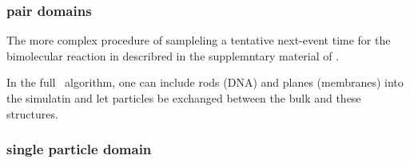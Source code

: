 \subsubsection{pair domains}
The more complex procedure of sampleling a tentative next-event time for the bimolecular reaction in describred in the supplemntary material of \cite{Takahashi2010}.




In the full \GFRD\ algorithm, one can include rods (DNA) and planes (membranes) into the simulatin and let particles be exchanged between the bulk and these structures.







\subsubsection{single particle domain}


